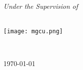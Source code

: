 \begin{titlepage}
\begin{center}
\large \textit{Under the Supervision of}\\[0cm]
\uppercase{\textbf{\SupervisorC}}\\[0.3cm]




        \centerline{\texttt{[image: mgcu.png]}}
\vfill
\vspace{0.3cm}
\normalsize{\departmentC}\\[-0.1cm] %

{\scshape\Large \UniversityC \par}\vspace{1cm} %
\vfill

{\large \today}\\[0.1cm] %

\vfill
\end{center}
\end{titlepage}
